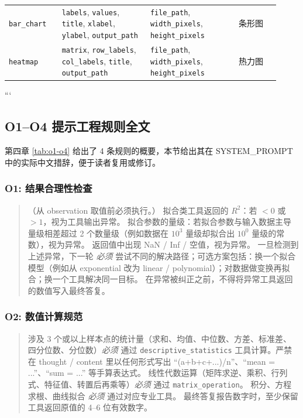 {\begin{longtable}{
    p{0.18\linewidth}
    p{0.30\linewidth}
    p{0.30\linewidth}
    p{0.14\linewidth}
    }
    \texttt{bar\_chart}
    &
    \texttt{labels},
    \texttt{values},
    \texttt{title},
    \texttt{xlabel},
    \texttt{ylabel},
    \texttt{output\_path}
    &
    \texttt{file\_path},
    \texttt{width\_pixels},
    \texttt{height\_pixels}
    &
    条形图
    \\
    
    \texttt{heatmap}
    &
    \texttt{matrix},
    \texttt{row\_labels},
    \texttt{col\_labels},
    \texttt{title},
    \texttt{output\_path}
    &
    \texttt{file\_path},
    \texttt{width\_pixels},
    \texttt{height\_pixels}
    &
    热力图
    \\
    
    \end{longtable}
    
    \normalsize
    ```
    

    \subsection{O1--O4 提示工程规则全文}

    第四章 \autoref{tab:o1-o4} 给出了 4 条规则的概要，本节给出其在 SYSTEM\_PROMPT 中的实际中文措辞，便于读者复用或修订。

    \subsubsection{O1: 结果合理性检查}

    \begin{quote}\small
    （从 observation 取值前必须执行。）
    拟合类工具返回的 $R^2$：若 $<0$ 或 $>1$，视为工具输出异常。
    拟合参数的量级：若拟合参数与输入数据主导量级相差超过 2 个数量级（例如数据在 $10^3$ 量级却拟合出 $10^0$ 量级的常数），视为异常。
    返回值中出现 NaN / Inf / 空值，视为异常。
    一旦检测到上述异常，下一轮 \emph{必须} 尝试不同的解决路径；可选方案包括：换一个拟合模型（例如从 exponential 改为 linear / polynomial）；对数据做变换再拟合；换一个工具解决同一目标。
    在异常被纠正之前，不得将异常工具返回的数值写入最终答复。
    \end{quote}

    \subsubsection{O2: 数值计算规范}

    \begin{quote}\small
    涉及 3 个或以上样本点的统计量（求和、均值、中位数、方差、标准差、四分位数、分位数）\emph{必须} 通过 \texttt{descriptive\_statistics} 工具计算。严禁在 thought / content 里以任何形式写出 “(a+b+c+...)/n”、“mean = ...”、“sum = ...” 等手算表达式。
    线性代数运算（矩阵求逆、乘积、行列式、特征值、转置后再乘等）\emph{必须} 通过 \texttt{matrix\_operation}。
    积分、方程求根、曲线拟合 \emph{必须} 通过对应专业工具。
    最终答复报告数字时，至少保留工具返回原值的 4--6 位有效数字。
    \end{quote}

}
